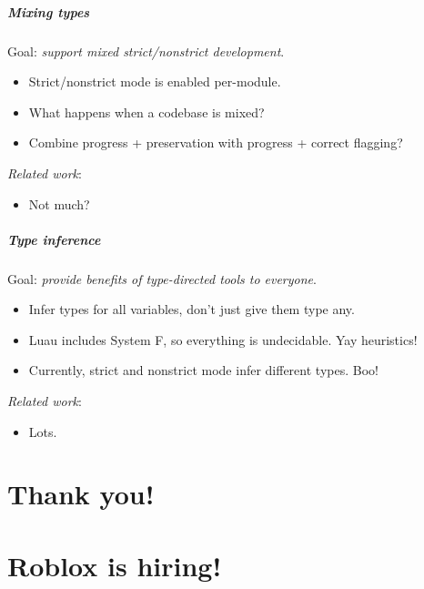 \documentclass[aspectratio=169]{beamer}
\begin{document}
\begin{frame}

\frametitle{Mixing types}

Goal: \emph{support mixed strict/nonstrict development}.

\begin{itemize}
\item Strict/nonstrict mode is enabled per-module.
\item What happens when a codebase is mixed?
\item Combine progress + preservation with progress + correct flagging?
\end{itemize}

\emph{Related work}:
\begin{itemize}
\item Not much?
\end{itemize}
  
\end{frame}

\begin{frame}

\frametitle{Type inference}

Goal: \emph{provide benefits of type-directed tools to everyone}.

\begin{itemize}
\item Infer types for all variables, don't just give them type any.
\item Luau includes System F, so everything is undecidable. Yay heuristics!
\item Currently, strict and nonstrict mode infer different types. Boo!
\end{itemize}

\emph{Related work}:
\begin{itemize}
\item Lots.
\end{itemize}

\end{frame}

\part{Thank you!}

\part{Roblox is hiring!}
\end{document}
